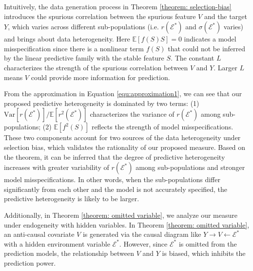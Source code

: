 Intuitively, the data generation process in Theorem \ref{theorem: selection-bias} introduces the spurious correlation between the spurious feature $V$ and the target $Y$, which varies across different sub-populations (i.e. $r(\mathcal E^*)$ and $\sigma(\mathcal E^*)$ varies) and brings about data heterogeneity.
Here $\mathbb{E}[f(S)S]=0$ indicates a model misspecification since there is a nonlinear term $f(S)$ that could not be inferred by the linear predictive family with the stable feature $S$. 
The constant $L$ characterizes the strength of the spurious correlation between $V$ and $Y$.
Larger $L$ means $V$ could provide more information for prediction.

From the approximation in Equation \ref{equ:approximation1}, we can see that our proposed predictive heterogeneity is dominated by two terms: (1) $\text{Var}[r(\mathcal E^*)]/\mathbb{E}[r^2(\mathcal E^*)]$ characterizes the variance of $r(\mathcal E^*)$ among sub-populations; (2) $\mathbb{E}[f^2(S)]$ reflects the strength of model misspecifications.
These two components account for two sources of the data heterogeneity under selection bias, which validates the rationality of our proposed measure. 
Based on the theorem, it can be inferred that the degree of predictive heterogeneity increases with greater variability of $r(\mathcal E^*)$ among sub-populations and stronger model misspecifications. 
In other words, when the sub-populations differ significantly from each other and the model is not accurately specified, the predictive heterogeneity is likely to be larger.


 Additionally, in Theorem \ref{theorem: omitted variable}, we analyze our measure under endogeneity with hidden variables.
 In Theorem \ref{theorem: omitted variable}, an anti-causal covariate $V$ is generated via the causal diagram  like $Y\rightarrow V \leftarrow \mathcal E^*$ with a hidden environment variable $\mathcal E^*$.
 However, since $\mathcal E^*$ is omitted from the prediction models, the relationship between $V$ and $Y$ is biased, which inhibits the prediction power.



